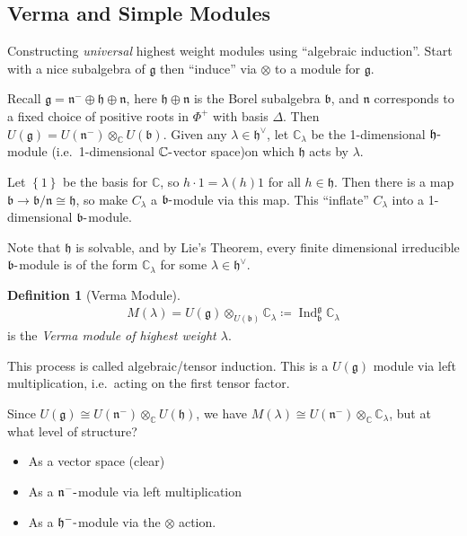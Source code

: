 \documentclass[11pt]{scrartcl}
\theoremstyle{definition}
\theoremstyle{theorem}
\theoremstyle{proof}
\theoremstyle{definition}
\newtheorem{definition}{Definition}[theorem]
\theoremstyle{break}
\theoremstyle{problem}
\providecommand{\tightlist}{%
  \setlength{\itemsep}{0pt}\setlength{\parskip}{0pt}}
\def\ind{\operatorname{Ind}}
\newcommand{\CC}[0]{{\mathbb{C}}}
\newcommand{\dash}[0]{{\hbox{-}}}
\newcommand{\definedas}[0]{\coloneqq}
\newcommand{\dual}[0]{^\vee}
\newcommand{\lieb}[0]{{\mathfrak{b}}}
\newcommand{\lieg}[0]{{\mathfrak{g}}}
\newcommand{\lieh}[0]{{\mathfrak{h}}}
\newcommand{\lien}[0]{{\mathfrak{n}}}
\newcommand{\tensor}[0]{\otimes}
\newcommand{\theset}[1]{\left\{{#1}\right\}}
\renewcommand{\to}[0]{\longrightarrow}
\begin{document}
\hypertarget{verma-and-simple-modules}{%
\subsection{Verma and Simple Modules}\label{verma-and-simple-modules}}

Constructing \emph{universal} highest weight modules using ``algebraic
induction''. Start with a nice subalgebra of \(\lieg\) then ``induce''
via \(\tensor\) to a module for \(\lieg\).

Recall \(\lieg = \lien^- \oplus \lieh \oplus \lien\), here
\(\lieh \oplus \lien\) is the Borel subalgebra \(\lieb\), and \(\lien\)
corresponds to a fixed choice of positive roots in \(\Phi^+\) with basis
\(\Delta\). Then \(U(\lieg) = U(\lien^-) \tensor_\CC U(\lieb)\). Given
any \(\lambda \in \lieh\dual\), let \(\CC_\lambda\) be the 1-dimensional
\(\lieh\dash\)module (i.e.~1-dimensional \(\CC\dash\)vector space)on
which \(\lieh\) acts by \(\lambda\).

Let \(\theset{1}\) be the basis for \(\CC\), so
\(h \cdot 1 = \lambda(h)1\) for all \(h\in \lieh\). Then there is a map
\(\lieb \to \lieb / \lien \cong \lieh\), so make \(C_\lambda\) a
\(\lieb\dash\)module via this map. This ``inflate'' \(C_\lambda\) into a
1-dimensional \(\lieb\dash\)module.

Note that \(\lieh\) is solvable, and by Lie's Theorem, every finite
dimensional irreducible \(\lieb\dash\)module is of the form
\(\CC_\lambda\) for some \(\lambda \in \lieh\dual\).

\begin{definition}[Verma Module]

\begin{align*}M(\lambda) = U(\lieg) \tensor_{U(\lieb)} \CC_\lambda \definedas \ind_\lieb^\lieg \CC_\lambda\end{align*}
is the \emph{Verma module of highest weight
\(\lambda\)}.\end{definition}

This process is called algebraic/tensor induction. This is a
\(U(\lieg)\) module via left multiplication, i.e.~acting on the first
tensor factor.

Since \(U(\lieg) \cong U(\lien^-) \tensor_\CC U(\lieh)\), we have
\(M(\lambda) \cong U(\lien^-) \tensor_\CC \CC_\lambda\), but at what
level of structure?

\begin{itemize}
\tightlist
\item
  As a vector space (clear)
\item
  As a \(\lien^-\dash\)module via left multiplication
\item
  As a \(\lieh^-\dash\)module via the \(\tensor\) action.
\end{itemize}
\end{document}
